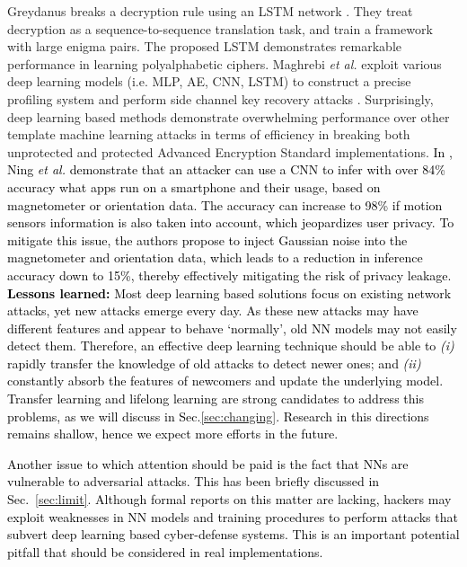 \documentclass[journal,comsoc,letter]{IEEEtran}
\newcommand{\edit}[1]{\textcolor{black}{#1}}
\newcommand{\rev}[1]{\textcolor{black}{#1}}
\begin{document}
Greydanus breaks a decryption rule using an LSTM network \cite{greydanus2017learning}. They treat decryption as a sequence-to-sequence translation task, and train a framework with large enigma pairs. The proposed LSTM demonstrates remarkable performance in learning polyalphabetic ciphers. Maghrebi \emph{et al.} exploit various deep learning models (i.e. MLP, AE, CNN, LSTM) to construct a precise profiling system and perform side channel key recovery attacks \cite{maghrebi2016breaking}. Surprisingly, deep learning based methods demonstrate overwhelming performance over other template machine learning attacks in terms of efficiency in  breaking both unprotected and protected Advanced Encryption Standard implementations. \rev{In \cite{ning2018deepmag}, Ning \emph{et al.} demonstrate that an attacker can use a CNN to infer with over 84\% accuracy what apps run on a smartphone and their usage, based on magnetometer or orientation data. The accuracy can increase to 98\% if motion sensors information is also taken into account, which jeopardizes user privacy. To mitigate this issue, the authors propose to inject Gaussian noise into the magnetometer and orientation data, which leads to a reduction in inference accuracy down to 15\%, thereby effectively mitigating the risk of privacy leakage.}\\

\edit{\textbf{Lessons learned:} Most deep learning based solutions focus on existing network attacks, yet new attacks emerge every day. As these new attacks may have different features and appear to behave `normally', old NN models may not easily detect them. Therefore, an effective deep learning technique should be able to \emph{(i)} rapidly transfer the knowledge of old attacks to detect newer ones; and \emph{(ii)} constantly absorb the features of newcomers and update the underlying model. Transfer learning and lifelong learning are strong candidates to address this problems, as we will discuss in Sec.\ref{sec:changing}. Research in this directions remains shallow, hence we expect more efforts in the future.}

\rev{Another issue to which attention should be paid is the fact that NNs are vulnerable to adversarial attacks. This has been briefly discussed in Sec.~\ref{sec:limit}. Although formal reports on this matter are lacking, hackers may exploit weaknesses in NN models and training procedures to perform attacks that subvert deep learning based cyber-defense systems. This is an important potential pitfall that should be considered in real implementations.}
\end{document}
